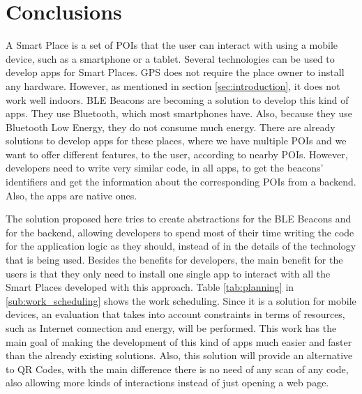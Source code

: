 
%
%

\section{Conclusions}
\label{sec:conclusions}
A Smart Place is a set of POIs that the user can interact
with using a mobile device, such as a smartphone or a tablet.
Several technologies can be used to develop apps for
Smart Places. GPS does not require the place owner to
install any hardware. However, as mentioned in 
section \ref{sec:introduction}, it does not work well
indoors. BLE Beacons are becoming a solution to
develop this kind of apps. They use Bluetooth,
which most smartphones have. Also, because they use
Bluetooth Low Energy, they do not consume much energy.
There are already solutions to develop apps for these
places, where we have multiple POIs and we want to
offer different features, to the user, according
to nearby POIs. However, developers need
to write very similar code, in all apps, to
get the beacons' identifiers and get the information
about the corresponding POIs from a backend.
Also, the apps are native ones.

The solution proposed here tries to create abstractions
for the BLE Beacons and for the backend, allowing
developers to spend most of their time writing the
code for the application logic as they should,
instead of in the details of the technology that is
being used. Besides the benefits for developers,
the main benefit for the users is that they only need
to install one single app to interact with all
the Smart Places developed with this approach.
Table \ref{tab:planning}
in \ref{sub:work_scheduling} shows the work scheduling.
Since it is a solution for mobile devices, an evaluation
that takes into account constraints in terms of resources,
such as Internet connection and energy, will be performed.
This work has the main goal of making the development
of this kind of apps much easier and faster than
the already existing solutions. Also, this solution
will provide an alternative
to QR Codes, with the main difference there is no need of
any scan of any code, also allowing more kinds of interactions
instead of just opening a web page. 
